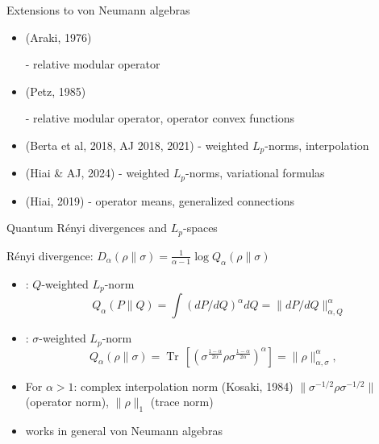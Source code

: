 \documentclass[mathserif]{beamer}
\newcommand{\<}{\langle}
\renewcommand{\>}{\rangle}
\newcommand{\Tr}{\operatorname{Tr}\,}
\begin{document}
\begin{frame}{Extensions to von Neumann algebras}





\begin{itemize}

\item {} {\small (Araki, 1976)}

\vskip 2mm
\hskip 3cm - relative modular operator
\vskip 2mm

\item {} {\small (Petz, 1985)}

\vskip 2mm
\hskip 1cm - relative modular operator, operator convex functions
\vskip 2mm

\item {} {\small (Berta et al, 2018, AJ 2018, 2021)}
\vskip 2mm
\hskip 3cm - weighted $L_p$-norms, interpolation
\vskip 2mm

\item {} {\small (Hiai \& AJ, 2024)}
\vskip 2mm
\hskip 3cm - weighted $L_p$-norms, variational formulas
\vskip 2mm
\vskip 3mm

\item {} {\small (Hiai, 2019)}
\vskip 2mm
\hskip 3cm - operator means, generalized connections
\vskip 2mm





\end{itemize}




\end{frame}

\begin{frame}{Quantum R\'enyi divergences and $L_p$-spaces}

R\'enyi divergence: $D_\alpha(\rho\|\sigma)=\frac1{\alpha-1}\log Q_{\alpha}(\rho\|\sigma)$

\bigskip

\begin{itemize}
\item {}: $Q$-weighted $L_p$-norm 
\[
Q_\alpha(P\|Q)=\int \left(dP/dQ\right)^\alpha
dQ=\|dP/dQ\|_{\alpha,Q}^\alpha
\]
\item {}: $\sigma$-weighted $L_p$-norm
\[
Q_\alpha(\rho\|\sigma)=\Tr\left[\left(
\sigma^{\frac{1-\alpha}{2\alpha}}\rho\sigma^{\frac{1-\alpha}{2\alpha}}\right)^\alpha\right]=\|\rho\|^\alpha_{\alpha,\sigma},\quad
\]
\item For $\alpha>1$: complex interpolation norm {\small (Kosaki, 1984)}
\vskip 3mm
 $\|\sigma^{-1/2}\rho\sigma^{-1/2}\|$ (operator norm),  $\|\rho\|_1$ (trace norm)

\item works in general von Neumann algebras
\end{itemize}


\end{frame}
\end{document}
